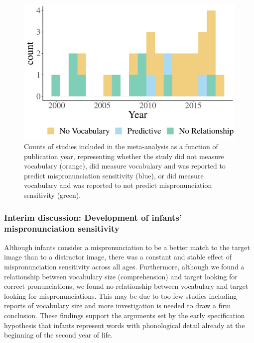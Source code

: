\documentclass[man, noextraspace]{apa6}
\begin{document}
\begin{figure}
\centering
\includegraphics{VonHolzenBergmann_MPMetaAnalysis_files/figure-latex/Vocabdescribe1-1.pdf}
\caption{\label{fig:Vocabdescribe1}Counts of studies included in the meta-analysis as a function of publication year, representing whether the study did not measure vocabulary (orange), did measure vocabulary and was reported to predict mispronunciation sensitivity (blue), or did measure vocabulary and was reported to not predict mispronunciation sensitivity (green).}
\end{figure}

\hypertarget{interim-discussion-development-of-infants-mispronunciation-sensitivity}{%
\subsubsection{Interim discussion: Development of infants' mispronunciation sensitivity}\label{interim-discussion-development-of-infants-mispronunciation-sensitivity}}

Although infants consider a mispronunciation to be a better match to the target image than to a distractor image, there was a constant and stable effect of mispronunciation sensitivity across all ages. Furthermore, although we found a relationship between vocabulary size (comprehension) and target looking for correct pronunciations, we found no relationship between vocabulary and target looking for mispronunciations. This may be due to too few studies including reports of vocabulary size and more investigation is needed to draw a firm conclusion. These findings support the arguments set by the early specification hypothesis that infants represent words with phonological detail already at the beginning of the second year of life.
\end{document}
